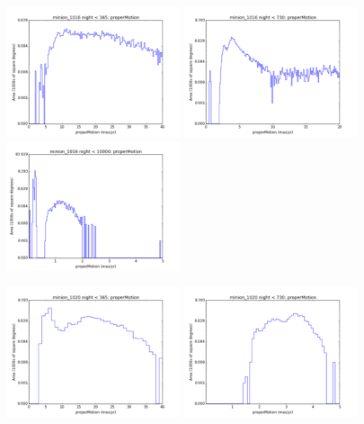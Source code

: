 \begin{figure}[ht]
  \begin{center}
  \includegraphics[width=2.0in]{./figs/milkyway/astromPanels/MW_Astrom_pmError_Baseline_01y_hst.png}
  \includegraphics[width=2.0in]{./figs/milkyway/astromPanels/MW_Astrom_pmError_Baseline_02y_hst.png}
  \includegraphics[width=2.0in]{./figs/milkyway/astromPanels/MW_Astrom_pmError_Baseline_10y_hst.png}
  \end{center}
  \begin{center}
  \includegraphics[width=2.0in]{./figs/milkyway/astromPanels/MW_Astrom_pmError_PanSTARRS_01y_hst.png}
  \includegraphics[width=2.0in]{./figs/milkyway/astromPanels/MW_Astrom_pmError_PanSTARRS_02y_hst.png}

\end{center}
\end{figure}
